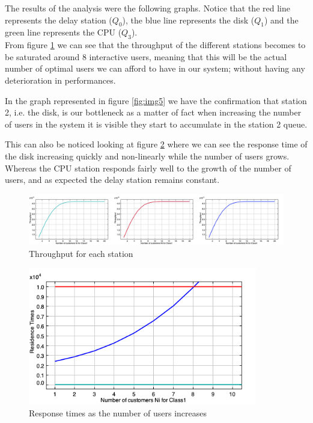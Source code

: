 \documentclass[11pt]{scrartcl} %
\begin{document}
The results of the analysis were the following graphs. Notice that the red line represents the delay station ($Q_0$), the blue line represents the disk ($Q_1$) and the green line represents the CPU ($Q_3$).\\

From figure \ref{fig:img3} we can see that the throughput of the different stations becomes to be saturated around 8 interactive users, meaning that this will be the actual number of optimal users we can afford to have in our system; without having any deterioration in performances. 

In the graph represented in figure \ref{fig:img5} we have the confirmation that station 2, i.e. the disk, is our bottleneck as a matter of fact when increasing the number of users in the system it is visible they start to accumulate in the station 2 queue.

This can also be noticed looking at figure \ref{fig:img4} where we can see the response time  of the disk increasing quickly and non-linearly while the number of users grows. Whereas the CPU station responds fairly well to the growth of the number of users, and as expected the delay station remains constant.


\begin{figure}[h]
\centering
\includegraphics[width=12cm]{Images/JMVAthroughputside.png}
\caption{Throughput for each station}
\label{fig:img3}
\end{figure}

\begin{figure}[h]
\includegraphics[width=10cm]{Images/JMVAresTimes.png}
\centering
\caption{Response times as the  number  of users increases}
\label{fig:img4}
\end{figure}
\end{document}
